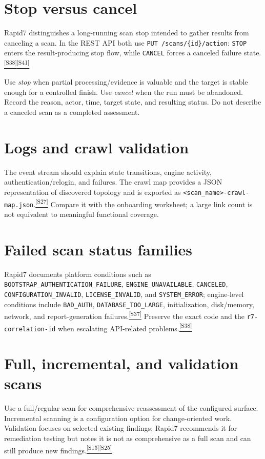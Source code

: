 \documentclass[11pt,letterpaper,oneside]{scrreprt}
\newcommand{\src}[1]{\hyperref[src:#1]{\textsuperscript{\color{R7Orange}[#1]}}}
\newcommand{\code}[1]{\texttt{#1}}
\begin{document}
\section{Stop versus cancel}
Rapid7 distinguishes a long-running scan stop intended to gather results from canceling a scan. In the REST API both use \code{PUT /scans/\{id\}/action}: \code{STOP} enters the result-producing stop flow, while \code{CANCEL} forces a canceled failure state.\src{S38}\src{S41}

\begin{safetybox}
Use \emph{stop} when partial processing/evidence is valuable and the target is stable enough for a controlled finish. Use \emph{cancel} when the run must be abandoned. Record the reason, actor, time, target state, and resulting status. Do not describe a canceled scan as a completed assessment.
\end{safetybox}

\section{Logs and crawl validation}
The event stream should explain state transitions, engine activity, authentication/relogin, and failures. The crawl map provides a JSON representation of discovered topology and is exported as \code{<scan\_\allowbreak name>-crawl-map.json}.\src{S27} Compare it with the onboarding worksheet; a large link count is not equivalent to meaningful functional coverage.

\section{Failed scan status families}
{\raggedright Rapid7 documents platform conditions such as \code{BOOTSTRAP\_\allowbreak }\allowbreak\code{AUTHENTICATION\_\allowbreak }\allowbreak\code{FAILURE}, \code{ENGINE\_\allowbreak UNAVAILABLE}, \code{CANCELED}, \code{CONFIGURATION\_\allowbreak INVALID}, \code{LICENSE\_\allowbreak INVALID}, and \code{SYSTEM\_\allowbreak ERROR}; engine-level conditions include \code{BAD\_\allowbreak AUTH}, \code{DATABASE\_\allowbreak TOO\_\allowbreak LARGE}, initialization, disk/\allowbreak memory, network, and report-generation failures.\src{S37} Preserve the exact code and the \code{r7-\allowbreak correlation-\allowbreak id} when escalating API-related problems.\src{S38}\par}

\section{Full, incremental, and validation scans}
Use a full/regular scan for comprehensive reassessment of the configured surface. Incremental scanning is a configuration option for change-oriented work. Validation focuses on selected existing findings; Rapid7 recommends it for remediation testing but notes it is not as comprehensive as a full scan and can still produce new findings.\src{S15}\src{S25}
\end{document}
